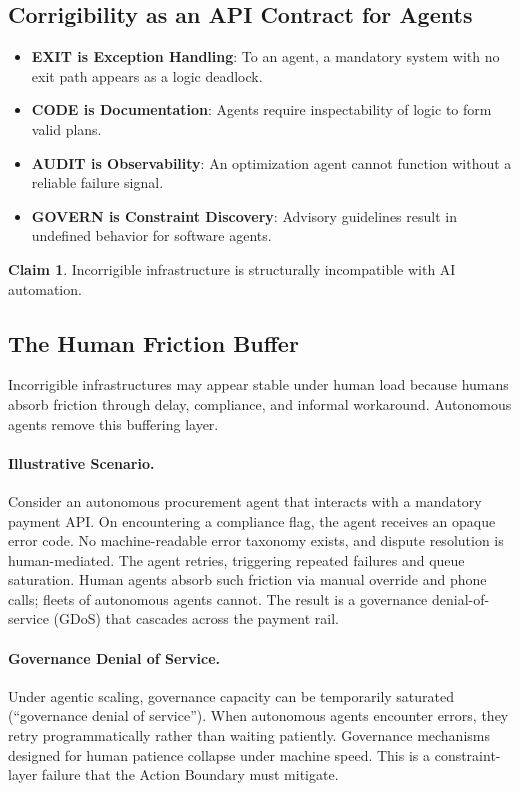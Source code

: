 \documentclass[11pt,a4paper]{article}
\theoremstyle{definition}
\newtheorem{claim}{Claim}[section]
\begin{document}
\subsection{Corrigibility as an API Contract for Agents}

\begin{itemize}[noitemsep]
    \item \textbf{EXIT is Exception Handling}: To an agent, a mandatory system with no exit path appears as a logic deadlock.
    \item \textbf{CODE is Documentation}: Agents require inspectability of logic to form valid plans.
    \item \textbf{AUDIT is Observability}: An optimization agent cannot function without a reliable failure signal.
    \item \textbf{GOVERN is Constraint Discovery}: Advisory guidelines result in undefined behavior for software agents.
\end{itemize}

\begin{claim}
Incorrigible infrastructure is structurally incompatible with AI automation.
\end{claim}

\subsection{The Human Friction Buffer}

Incorrigible infrastructures may appear stable under human load because humans absorb friction through delay, compliance, and informal workaround. Autonomous agents remove this buffering layer.

\paragraph{Illustrative Scenario.} Consider an autonomous procurement agent that interacts with a mandatory payment API. On encountering a compliance flag, the agent receives an opaque error code. No machine-readable error taxonomy exists, and dispute resolution is human-mediated. The agent retries, triggering repeated failures and queue saturation. Human agents absorb such friction via manual override and phone calls; fleets of autonomous agents cannot. The result is a governance denial-of-service (GDoS) that cascades across the payment rail.

\paragraph{Governance Denial of Service.} Under agentic scaling, governance capacity can be temporarily saturated (``governance denial of service''). When autonomous agents encounter errors, they retry programmatically rather than waiting patiently. Governance mechanisms designed for human patience collapse under machine speed. This is a constraint-layer failure that the Action Boundary must mitigate.
\end{document}
